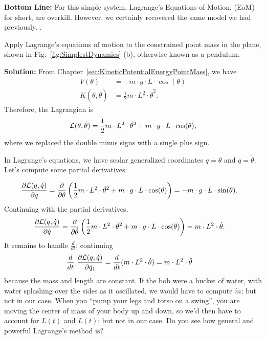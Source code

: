 \textbf{Bottom Line:} For this simple system, Lagrange's Equations of Motion, (EoM) for short, are overkill. However, we certainly recovered the same model we had previously.
\Qed. 

\bigskip

\begin{exercise}
\label{ex:PendulumModel}
    Apply Lagrange's equations of motion to the constrained point mass in the plane, shown in Fig.~\ref{fig:SimplestDynamics}-(b), otherwise known as a pendulum.
\end{exercise}

\textbf{Solution:} From Chapter~\ref{sec:KineticPotentialEnergyPointMass}, we have
\begin{align*}
    V(\theta)&=- m \cdot g \cdot L \cdot \cos(\theta)\\
    K(\theta, \dot{\theta})&=  \frac{1}{2} m \cdot L^2 \cdot \dot{\theta}^2.
\end{align*}
Therefore, the Lagrangian is 
$$ {\cal L}(\theta, \dot{\theta}) = \frac{1}{2} m \cdot L^2 \cdot \dot{\theta}^2 + m \cdot g \cdot L \cdot \cos(\theta),$$
where we replaced the double minus signs with a single plus sign. 

In Lagrange's equations, we have scalar generalized coordinates $q = \theta$ and $\dot{q} = \dot{\theta}$. Let's compute some partial derivatives:

\begin{align*}
    \frac{ \partial {\cal L}(q, \dot{q}) }{\partial q}& =  \frac{ \partial }{\partial \theta} \left(\frac{1}{2} m \cdot L^2 \cdot \dot{\theta}^2 + m \cdot g \cdot L \cdot \cos(\theta) \right)  = - m\cdot g\cdot L \cdot \sin(\theta).
\end{align*}
Continuing with the partial derivatives, 
\begin{align*}
    \frac{ \partial {\cal L}(q, \dot{q})}{\partial \dot{q}}& =   \frac{ \partial }{\partial \dot{\theta}} \left(\frac{1}{2} m \cdot L^2 \cdot \dot{\theta}^2 + m \cdot g \cdot L \cdot \cos(\theta) \right) =
     m \cdot L^2 \cdot \dot{\theta}.
\end{align*}
It remains to handle $\frac{d}{dt}$; continuing
\begin{align*}
   \frac{d}{dt}~ \frac{ \partial {\cal L}(q, \dot{q})}{\partial \dot{q}_1}& =  \frac{d}{dt}( m \cdot L^2 \cdot \dot{\theta}) =  m \cdot L^2 \cdot \ddot{\theta}
\end{align*}
because the mass and length are constant. If the bob were a bucket of water, with water splashing over the sides as it oscillated, we would have to compute $\dot{m}$; but not in our case. When you ``pump your legs and torso on a swing'', you are moving the center of mass of your body up and down, so we'd then have to account for $L(t)$ and $\dot{L}(t)$; but not in our case. Do you see how general and powerful Lagrange's method is? 

